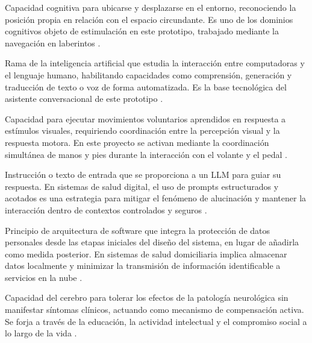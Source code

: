 \begin{description}[leftmargin=0pt, labelwidth=\textwidth, 
                    labelsep=0pt, style=nextline]
\item[\textbf{Orientación espacial}]
Capacidad cognitiva para ubicarse y desplazarse en el entorno, 
reconociendo la posición propia en relación con el espacio circundante. 
Es uno de los dominios cognitivos objeto de estimulación en este prototipo, 
trabajado mediante la navegación en laberintos \parencite{bermejo2021}.

\item[\textbf{PLN (Procesamiento de Lenguaje Natural)}]
Rama de la inteligencia artificial que estudia la interacción entre 
computadoras y el lenguaje humano, habilitando capacidades como 
comprensión, generación y traducción de texto o voz de forma automatizada. 
Es la base tecnológica del asistente conversacional de este prototipo 
\parencite{moret}.

\item[\textbf{Praxias visomotoras}]
Capacidad para ejecutar movimientos voluntarios aprendidos en respuesta 
a estímulos visuales, requiriendo coordinación entre la percepción visual 
y la respuesta motora. En este proyecto se activan mediante la coordinación 
simultánea de manos y pies durante la interacción con el volante y el pedal 
\parencite{bermejo2021, AbdAlrazaq2022}.

\item[\textbf{\textit{Prompt}}]
Instrucción o texto de entrada que se proporciona a un LLM para guiar su 
respuesta. En sistemas de salud digital, el uso de prompts estructurados 
y acotados es una estrategia para mitigar el fenómeno de alucinación y 
mantener la interacción dentro de contextos controlados y seguros 
\parencite{Ortega2024, moret}.

\item[\textbf{Privacidad por diseño (\textit{Privacy by Design})}]
Principio de arquitectura de software que integra la protección de datos 
personales desde las etapas iniciales del diseño del sistema, en lugar 
de añadirla como medida posterior. En sistemas de salud domiciliaria 
implica almacenar datos localmente y minimizar la transmisión de 
información identificable a servicios en la nube \parencite{moret, 
Munoz2025}.

\item[\textbf{Reserva cognitiva (RC)}]
Capacidad del cerebro para tolerar los efectos de la patología neurológica 
sin manifestar síntomas clínicos, actuando como mecanismo de compensación 
activa. Se forja a través de la educación, la actividad intelectual y el 
compromiso social a lo largo de la vida \parencite{Stern2022, 
Giovagnoli2024}.


\end{description}
